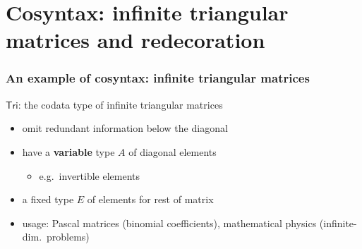 \documentclass[
]
{beamer}
\newcommand{\constfont}[1]{\ensuremath{\mathsf{#1}}}
\newcommand{\Tri}{\constfont{Tri}}
\newcommand{\fat}[1]{\textbf{#1}}
\begin{document}
\section{Cosyntax: infinite triangular matrices and redecoration}

\begin{frame}
 \frametitle{An example of cosyntax: infinite triangular matrices}
 
   \begin{block}{\Tri: the codata type of infinite triangular matrices}
     \begin{itemize}
      \item omit redundant information below the diagonal
      \item have a \fat{variable} type $A$ of diagonal elements 
        \begin{itemize} 
          \item e.g.\ invertible elements
        \end{itemize}
      \item a fixed type $E$ of elements for rest of matrix
      \item usage: Pascal matrices (binomial coefficients), mathematical physics (infinite-dim.\ problems)
     \end{itemize}
   \end{block}
   
   
\begin{center}
   
 
%

\end{center}
 

   
\end{frame}
\end{document}
